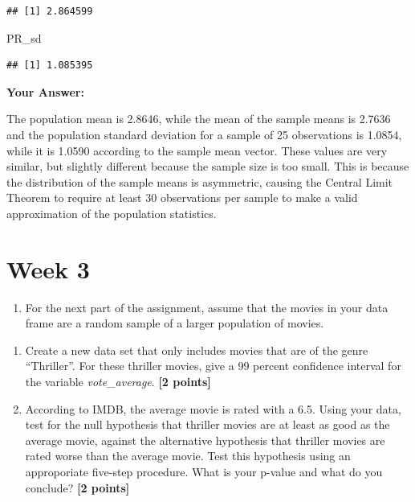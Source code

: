 \documentclass[
]{article}
\newenvironment{Shaded}{\begin{snugshade}}{\end{snugshade}}
\newcommand{\NormalTok}[1]{#1}
\providecommand{\tightlist}{%
  \setlength{\itemsep}{0pt}\setlength{\parskip}{0pt}}
\begin{document}
\begin{verbatim}
## [1] 2.864599
\end{verbatim}

\begin{Shaded}
\begin{Highlighting}[]
\NormalTok{PR\_sd}
\end{Highlighting}
\end{Shaded}

\begin{verbatim}
## [1] 1.085395
\end{verbatim}

\textbf{Your Answer:}

The population mean is 2.8646, while the mean of the sample means is
2.7636 and the population standard deviation for a sample of 25
observations is 1.0854, while it is 1.0590 according to the sample mean
vector. These values are very similar, but slightly different because
the sample size is too small. This is because the distribution of the
sample means is asymmetric, causing the Central Limit Theorem to require
at least 30 observations per sample to make a valid approximation of the
population statistics.

\section{Week 3}\label{week-3}

\begin{enumerate}
\def\labelenumi{\arabic{enumi}.}
\tightlist
\item
  For the next part of the assignment, assume that the movies in your
  data frame are a random sample of a larger population of movies.
\end{enumerate}

\begin{enumerate}
\def\labelenumi{\alph{enumi}.}
\item
  Create a new data set that only includes movies that are of the genre
  ``Thriller''. For these thriller movies, give a 99 percent confidence
  interval for the variable \emph{vote\_average}. \textbf{[2 points]}
\item
  According to IMDB, the average movie is rated with a 6.5. Using your
  data, test for the null hypothesis that thriller movies are at least
  as good as the average movie, against the alternative hypothesis that
  thriller movies are rated worse than the average movie. Test this
  hypothesis using an approporiate five-step procedure. What is your
  p-value and what do you conclude? \textbf{[2 points]}
\end{enumerate}
\end{document}
